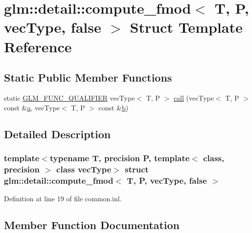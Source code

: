 \hypertarget{structglm_1_1detail_1_1compute__fmod_3_01_t_00_01_p_00_01vec_type_00_01false_01_4}{}\section{glm\+::detail\+::compute\+\_\+fmod$<$ T, P, vec\+Type, false $>$ Struct Template Reference}
\label{structglm_1_1detail_1_1compute__fmod_3_01_t_00_01_p_00_01vec_type_00_01false_01_4}
\subsection*{Static Public Member Functions}
\begin{DoxyCompactItemize}
\item 
static \mbox{\hyperlink{setup_8hpp_a33fdea6f91c5f834105f7415e2a64407}{G\+L\+M\+\_\+\+F\+U\+N\+C\+\_\+\+Q\+U\+A\+L\+I\+F\+I\+ER}} vec\+Type$<$ T, P $>$ \mbox{\hyperlink{structglm_1_1detail_1_1compute__fmod_3_01_t_00_01_p_00_01vec_type_00_01false_01_4_aba714e77ed7c4a97b9978c1c09fd6472}{call}} (vec\+Type$<$ T, P $>$ const \&\mbox{\hyperlink{glad_8h_ac8729153468b5dcf13f971b21d84d4e5}{a}}, vec\+Type$<$ T, P $>$ const \&\mbox{\hyperlink{glad_8h_a6eba317e3cf44d6d26c04a5a8f197dcb}{b}})
\end{DoxyCompactItemize}


\subsection{Detailed Description}
\subsubsection*{template$<$typename T, precision P, template$<$ class, precision $>$ class vec\+Type$>$\newline
struct glm\+::detail\+::compute\+\_\+fmod$<$ T, P, vec\+Type, false $>$}



Definition at line 19 of file common.\+inl.



\subsection{Member Function Documentation}
\mbox{\label{structglm_1_1detail_1_1compute__fmod_3_01_t_00_01_p_00_01vec_type_00_01false_01_4_aba714e77ed7c4a97b9978c1c09fd6472}} 
